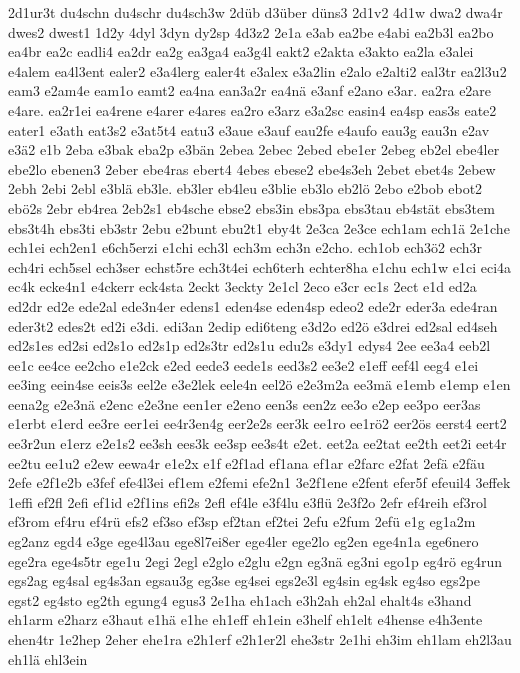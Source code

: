 {2d1ur3t
du4schn
du4schr
du4sch3w
2düb
d3über
düns3
2d1v2
4d1w
dwa2
dwa4r
dwes2
dwest1
1d2y
4dyl
3dyn
dy2sp
4d3z2
2e1a
e3ab
ea2be
e4abi
ea2b3l
ea2bo
ea4br
ea2c
eadli4
ea2dr
ea2g
ea3ga4
ea3g4l
eakt2
e2akta
e3akto
ea2la
e3alei
e4alem
ea4l3ent
ealer2
e3a4lerg
ealer4t
e3alex
e3a2lin
e2alo
e2alti2
eal3tr
ea2l3u2
eam3
e2am4e
eam1o
eamt2
ea4na
ean3a2r
ea4nä
e3anf
e2ano
e3ar.
ea2ra
e2are
e4are.
ea2r1ei
ea4rene
e4arer
e4ares
ea2ro
e3arz
e3a2sc
easin4
ea4sp
eas3s
eate2
eater1
e3ath
eat3s2
e3at5t4
eatu3
e3aue
e3auf
eau2fe
e4aufo
eau3g
eau3n
e2av
e3ä2
e1b
2eba
e3bak
eba2p
e3bän
2ebea
2ebec
2ebed
ebe1er
2ebeg
eb2el
ebe4ler
ebe2lo
ebenen3
2eber
ebe4ras
ebert4
4ebes
ebese2
ebe4s3eh
2ebet
ebet4s
2ebew
2ebh
2ebi
2ebl
e3blä
eb3le.
eb3ler
eb4leu
e3blie
eb3lo
eb2lö
2ebo
e2bob
ebot2
ebö2s
2ebr
eb4rea
2eb2s1
eb4sche
ebse2
ebs3in
ebs3pa
ebs3tau
eb4stät
ebs3tem
ebs3t4h
ebs3ti
eb3str
2ebu
e2bunt
ebu2t1
eby4t
2e3ca
2e3ce
ech1am
ech1ä
2e1che
ech1ei
ech2en1
e6ch5erzi
e1chi
ech3l
ech3m
ech3n
e2cho.
ech1ob
ech3ö2
ech3r
ech4ri
ech5sel
ech3ser
echst5re
ech3t4ei
ech6terh
echter8ha
e1chu
ech1w
e1ci
eci4a
ec4k
ecke4n1
e4ckerr
eck4sta
2eckt
3eckty
2e1cl
2eco
e3cr
ec1s
2ect
e1d
ed2a
ed2dr
ed2e
ede2al
ede3n4er
edens1
eden4se
eden4sp
edeo2
ede2r
eder3a
ede4ran
eder3t2
edes2t
ed2i
e3di.
edi3an
2edip
edi6teng
e3d2o
ed2ö
e3drei
ed2sal
ed4seh
ed2s1es
ed2si
ed2s1o
ed2s1p
ed2s3tr
ed2s1u
edu2s
e3dy1
edys4
2ee
ee3a4
eeb2l
ee1c
ee4ce
ee2cho
e1e2ck
e2ed
eede3
eede1s
eed3s2
ee3e2
e1eff
eef4l
eeg4
e1ei
ee3ing
eein4se
eeis3s
eel2e
e3e2lek
eele4n
eel2ö
e2e3m2a
ee3mä
e1emb
e1emp
e1en
eena2g
e2e3nä
e2enc
e2e3ne
een1er
e2eno
een3s
een2z
ee3o
e2ep
ee3po
eer3as
e1erbt
e1erd
ee3re
eer1ei
ee4r3en4g
eer2e2s
eer3k
ee1ro
ee1rö2
eer2ös
eerst4
eert2
ee3r2un
e1erz
e2e1s2
ee3sh
ees3k
ee3sp
ee3s4t
e2et.
eet2a
ee2tat
ee2th
eet2i
eet4r
ee2tu
ee1u2
e2ew
eewa4r
e1e2x
e1f
e2f1ad
ef1ana
ef1ar
e2farc
e2fat
2efä
e2fäu
2efe
e2f1e2b
e3fef
efe4l3ei
ef1em
e2femi
efe2n1
3e2f1ene
e2fent
efer5f
efeuil4
3effek
1effi
ef2fl
2efi
ef1id
e2f1ins
efi2s
2efl
ef4le
e3f4lu
e3flü
2e3f2o
2efr
ef4reih
ef3rol
ef3rom
ef4ru
ef4rü
efs2
ef3so
ef3sp
ef2tan
ef2tei
2efu
e2fum
2efü
e1g
eg1a2m
eg2anz
egd4
e3ge
ege4l3au
ege8l7ei8er
ege4ler
ege2lo
eg2en
ege4n1a
ege6nero
ege2ra
ege4s5tr
ege1u
2egi
2egl
e2glo
e2glu
e2gn
eg3nä
eg3ni
ego1p
eg4rö
eg4run
egs2ag
eg4sal
eg4s3an
egsau3g
eg3se
eg4sei
egs2e3l
eg4sin
eg4sk
eg4so
egs2pe
egst2
eg4sto
eg2th
egung4
egus3
2e1ha
eh1ach
e3h2ah
eh2al
ehalt4s
e3hand
eh1arm
e2harz
e3haut
e1hä
e1he
eh1eff
eh1ein
e3helf
eh1elt
e4hense
e4h3ente
ehen4tr
1e2hep
2eher
ehe1ra
e2h1erf
e2h1er2l
ehe3str
2e1hi
eh3im
eh1lam
eh2l3au
eh1lä
ehl3ein
}
